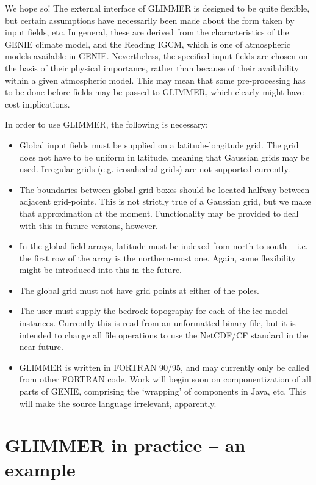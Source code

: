 We hope so! The external interface of GLIMMER is designed to be quite
flexible, but certain assumptions have necessarily been made about the form
taken by input fields, etc. In general, these are derived from the
characteristics of the GENIE climate model, and the Reading IGCM, which is one
of atmospheric models available in GENIE. Nevertheless, the specified input
fields are chosen on the basis of their physical importance, rather than
because of their availability within a given atmospheric model. This may mean
that some pre-processing has to be done before fields may be passed to
GLIMMER, which clearly might have cost implications.

In order to use GLIMMER, the following is necessary:

\begin{itemize}
\item Global input fields must be supplied on a latitude-longitude
  grid. The grid does not have to be uniform in latitude, meaning that
  Gaussian grids may be used. Irregular grids (e.g. icosahedral grids) are not
  supported currently. 
\item The boundaries between global grid boxes should be located halfway
  between adjacent grid-points. This is not strictly true of a Gaussian grid,
  but we make that approximation at the moment. Functionality may be provided
  to deal with this in future versions, however.
\item In the global field arrays, latitude must be indexed from north to south
  -- i.e. the first row of the array is the northern-most one. Again, some
  flexibility might be introduced into this in the future.
\item The global grid must not have grid points at either of the poles.
\item The user must supply the bedrock topography for each of the ice model
  instances. Currently this is read from an unformatted binary file, but it is
  intended to change all file operations to use the NetCDF/CF standard in the
  near future.
\item GLIMMER is written in FORTRAN 90/95, and may currently only be called from
  other FORTRAN code. Work will begin soon on componentization of
  all parts of GENIE, comprising the `wrapping' of components in Java,
  etc. This will make the source language irrelevant, apparently.
\end{itemize}

\section{GLIMMER in practice -- an example}

